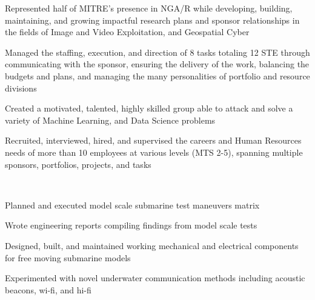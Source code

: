 \documentclass[letterpaper]{deedy-resume} %
\begin{document}
\begin{minipage}[t]{0.69\textwidth}
\begin{tightitemize}
\item Represented half of MITRE's presence in NGA/R while developing, building, maintaining, and growing impactful research plans and sponsor relationships in the fields of Image and Video Exploitation, and Geospatial Cyber
\item Managed the staffing, execution, and direction of 8 tasks totaling 12 STE through communicating with the sponsor, ensuring the delivery of the work, balancing the budgets and plans, and managing the many personalities of portfolio and resource divisions
\end{tightitemize}
\begin{tightitemize}
\item Created a motivated, talented, highly skilled group able to attack and solve a variety of Machine Learning, and Data Science problems  
\item Recruited, interviewed, hired, and supervised the careers and Human Resources needs of more than 10 employees at various levels (MTS 2-5), spanning multiple sponsors, portfolios, projects, and tasks
\end{tightitemize}
%
\vspace{\topsep} %

\sectionspace %


 \\
\begin{tightitemize}
\item Planned and executed model scale submarine test maneuvers matrix
\item Wrote engineering reports compiling findings from model scale tests
\item Designed, built, and maintained working mechanical and electrical components for free moving submarine models
\item Experimented with novel underwater communication methods including acoustic beacons, wi-fi, and hi-fi
\end{tightitemize}


\end{minipage}
\end{document}
